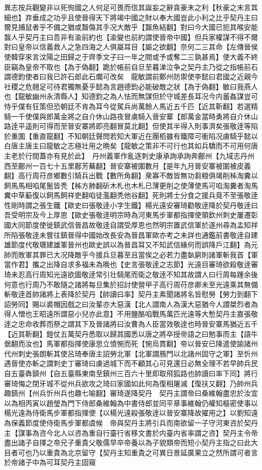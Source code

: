 異志按兵觀變非以死徇國之人何足可畏而信其誕妄之辭貪豪末之利【秋豪之末言其細也】弃垂成之功乎且使晉得天下將竭中國之財以奉大國豈此小利之比乎契丹主曰爾見捕鼠者乎不備之猶或齧傷其手况大敵乎【齧魚結翻】對曰今大國已扼其喉安能齧人乎契丹主曰吾非有渝前約也【渝變也前約謂使晉帝中國】但兵家權謀不得不爾對曰皇帝以信義救人之急四海之人俱屬耳目【屬之欲翻】奈何二三其命【左傳晉侯使韓穿來言汶陽之田歸之于齊季文子曰一年之間或予或奪二三孰甚焉】使大義不終臣竊為皇帝不取也【為于偽翻】跪於帳前自旦至暮涕泣争之契丹主乃從之指帳前石謂德鈞使者曰我已許石郎此石爛可改矣　龍敏謂前鄭州防禦使李懿曰君國之近親今社稷之危翹足可待君獨無憂乎懿為言趙德鈞必能破敵之狀【為于偽翻】敏曰我燕人也【龍敏幽州永清縣人】知德鈞之為人怯而無謀但於守城差長耳况今内蓄姦謀豈可恃乎僕有狂策但恐朝廷不肯為耳今從駕兵尚萬餘人馬近五千匹【近其靳翻】若選精騎一千使僕與郎萬金將之自介休山路夜冒虜騎入晉安寨【郎萬金當時勇將自介休山路逹平遥則可得而至晉安寨將即亮翻冒莫北翻】但使其半得入則事濟矣張敬逹等陷於重圍【重直龍翻】不知朝廷聲問若知大軍近在團栢雖有鐵障可衝陷况虜騎乎懿以白唐主唐主曰龍敏之志極壮用之晩矣【龍敏之策非不可行也其如兵驕而不可用何唐主老於行間蓋亦有見於此】　丹州義軍作亂逐刺史康承詢承詢奔鄜州【九域志丹州西至鄜州一百七十五里鄜芳蕪翻】晉安寨被圍數月【是年九月晉安寨被圍被皮義翻】高行周苻彦鄉數引騎兵出戰【數所角翻】衆寡不敵皆無功芻粮俱竭削柹淘糞以飼馬馬相啗尾鬛皆秃【柹方肺翻斫木札也木札已薄更削之使薄使馬可啗淘糞者淘馬糞中草䈥復以飼馬飼祥吏翻啗徒濫翻秃他谷翻】死則將士分食之援兵竟不至張敬逹性剛時謂之張生鐵【歐史曰張敬逹小字生鐵】楊光遠安審琦勸敬逹降於契丹敬逹曰吾受明宗及今上厚恩【歐史張敬逹明宗時為河東馬步軍都指揮使領欽州刺史屢遷彰國大同節度使徙鎮武信晉昌故敬逹自謂受厚恩也然明宗置武信軍於遂州尋為孟知祥所陷張敬逹未嘗往鎮晉得中國始改長安為晉昌軍歐亦考之未詳也通鑑前書敬逹自建雄節度代敬瑭建雄軍晉州也歐史誤以為晉昌耳又不知武信緣何而誤降戶江翻】為元帥而敗軍其罪已大况降敵乎今援兵旦暮至且當俟之必若力盡埶窮則諸軍斬我首【軍當作君】攜之出降自求多福未為晩也【史言張敬逹之志節】光遠目審琦欲殺敬逹審琦未忍高行周知光遠欲圖敬逹常引壮騎尾而衛之敬逹不知其故謂人曰行周每踵余後何意也行周乃不敢隨之諸將每旦集於招討使營甲子高行周苻彦卿未至光遠乘其無備斬敬逹首帥諸將上表降於契丹【帥讀曰率】契丹主素聞諸將名皆慰勞【勞力到翻下詔勞同】賜以裘帽因戲之曰汝輩亦大惡漢【北人謂南人為漢大惡猶今人謂桀烈者為得人憎也王昭遠所謂惡小兒亦此意】不用鹽酪啗戰馬萬匹光遠等大慙契丹主嘉張敬逹之忠命收葬而祭之謂其下及晉諸將曰汝曹為人臣當效敬逹也時晉安寨馬猶近五千【近其靳翻】鎧仗五萬契丹悉取以歸其國悉以唐之將卒授帝語之曰勉事而主【語牛倨翻而汝也】馬軍都指揮使康思立憤惋而死【惋烏貫翻】帝以晉安已降遣使諭諸州代州刺史張朗斬其使呂琦奉唐主詔勞北軍【北軍謂鴈門以北諸州固守之軍】至忻州遇晉使亦斬之謂刺史丁審琦曰虜過城下而不顧其心可見還日必無全理不若早帥兵民自五臺犇鎮州【自五臺縣東南至鎮州三百六十里即取飛狐路也帥讀曰率下同】將行審琦悔之閉牙城不從州兵欲攻之琦曰家國如此何為復相屠滅【復扶又翻】乃帥州兵趣鎮州【州兵忻州兵也趣七喻翻】審琦遂降契丹　契丹主謂帝曰桑維翰盡忠於汝宜以為相丙寅以趙瑩為門下侍郎桑維翰為中書侍郎並同平章事維翰仍權知樞密使事以楊光遠為侍衛馬步軍都指揮使【以楊光遠殺張敬逹以晉安寨降故擢用之】以劉知遠為保義節度使侍衛馬步軍都虞候　帝與契丹主將引兵而南欲留一子守河東咨於契丹主【謀事為咨今北人以咨為重自行臺行省移文書於内臺内省率謂之咨】契丹主令帝盡出諸子自擇之帝兄子重貴父敬儒早卒帝養以為子貌類帝而短小契丹主指之曰此大目者可也乃以重貴為北京留守【契丹主知重貴之可異日景延廣果立之然所謂可者言於帝諸子中為可耳契丹主固窺